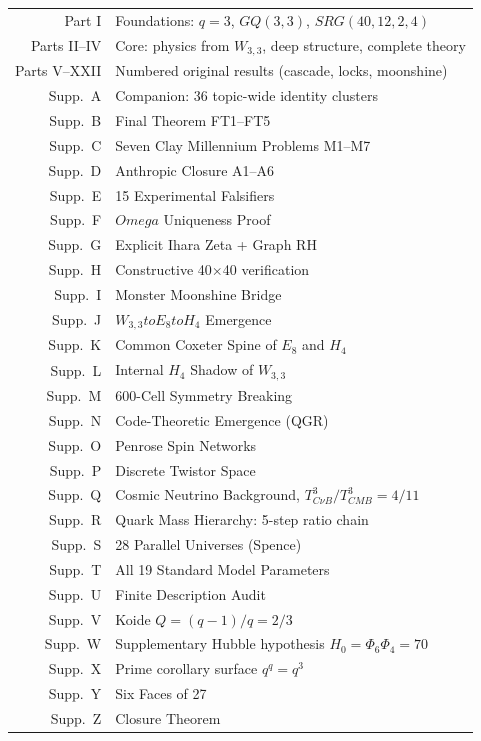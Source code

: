 \documentclass[12pt,a4paper]{article}
\def\mathrm#1{#1}%
\def\textbf#1{#1}%
\def\Phi#1{Phi#1}%
\def\Omega{Omega}%
\def\to{ to }%
\theoremstyle{definition}
\newcommand{\SRG}{\mathrm{SRG}}
\newcommand{\GQ}{\mathrm{GQ}}
\begin{document}
\begin{center}
\renewcommand{\arraystretch}{1.25}
\begin{tabular}{rl}
\toprule
\textbf{Part I} & Foundations: $q=3$, $\GQ(3,3)$, $\SRG(40,12,2,4)$ \\
\textbf{Parts II--IV} & Core: physics from $W_{3,3}$, deep structure, complete theory \\
\textbf{Parts V--XXII} & Numbered original results (cascade, locks, moonshine) \\
\textbf{Supp.\ A} & Companion: 36 topic-wide identity clusters \\
\textbf{Supp.\ B} & Final Theorem FT1--FT5 \\
\textbf{Supp.\ C} & Seven Clay Millennium Problems M1--M7 \\
\textbf{Supp.\ D} & Anthropic Closure A1--A6 \\
\textbf{Supp.\ E} & 15 Experimental Falsifiers \\
\textbf{Supp.\ F} & $\Omega$ Uniqueness Proof \\
\textbf{Supp.\ G} & Explicit Ihara Zeta + Graph RH \\
\textbf{Supp.\ H} & Constructive 40$\times$40 verification \\
\textbf{Supp.\ I} & Monster Moonshine Bridge \\
\textbf{Supp.\ J} & $W_{3,3} \to E_8 \to H_4$ Emergence \\
\textbf{Supp.\ K} & Common Coxeter Spine of $E_8$ and $H_4$ \\
\textbf{Supp.\ L} & Internal $H_4$ Shadow of $W_{3,3}$ \\
\textbf{Supp.\ M} & 600-Cell Symmetry Breaking \\
\textbf{Supp.\ N} & Code-Theoretic Emergence (QGR) \\
\textbf{Supp.\ O} & Penrose Spin Networks \\
\textbf{Supp.\ P} & Discrete Twistor Space \\
\textbf{Supp.\ Q} & Cosmic Neutrino Background, $T_{C\nu B}^3/T_{CMB}^3 = 4/11$ \\
\textbf{Supp.\ R} & Quark Mass Hierarchy: 5-step ratio chain \\
\textbf{Supp.\ S} & 28 Parallel Universes (Spence) \\
\textbf{Supp.\ T} & All 19 Standard Model Parameters \\
\textbf{Supp.\ U} & Finite Description Audit \\
\textbf{Supp.\ V} & Koide $Q = (q-1)/q = 2/3$ \\
\textbf{Supp.\ W} & Supplementary Hubble hypothesis $H_0 = \Phi_6\Phi_4 = 70$ \\
\textbf{Supp.\ X} & \textbf{Prime corollary surface $q^q = q^3$} \\
\textbf{Supp.\ Y} & Six Faces of 27 \\
\textbf{Supp.\ Z} & \textbf{Closure Theorem} \\
\bottomrule
\end{tabular}
\end{center}
\end{document}
